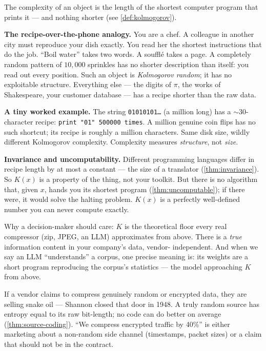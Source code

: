 \documentclass[12pt,a4paper]{article}
\theoremstyle{plain}
\theoremstyle{definition}
\begin{document}
\begin{intuition}
The complexity of an object is the length of the shortest computer
program that prints it --- and nothing shorter (see
\cref{def:kolmogorov}).

\textbf{The recipe-over-the-phone analogy.}  You are a chef.  A
colleague in another city must reproduce your dish exactly.  You read
her the shortest instructions that do the job.  ``Boil water'' takes
two words.  A souffl\'{e} takes a page.  A completely random pattern
of $10{,}000$ sprinkles has no shorter description than itself: you
read out every position.  Such an object is \emph{Kolmogorov random};
it has no exploitable structure.  Everything else --- the digits of
$\pi$, the works of Shakespeare, your customer database --- has a
recipe shorter than the raw data.

\textbf{A tiny worked example.}  The string
\texttt{01010101\ldots} (a million long) has a $\sim 30$-character
recipe: \texttt{print "01" 500000 times}.  A million genuine coin
flips has no such shortcut; its recipe is roughly a million
characters.  Same disk size, wildly different Kolmogorov complexity.
Complexity measures \emph{structure}, not \emph{size}.

\textbf{Invariance and uncomputability.}  Different programming
languages differ in recipe length by at most a constant --- the size
of a translator (\cref{thm:invariance}).  So $K(x)$ is a property of
the thing, not your toolkit.  But there is no algorithm that, given
$x$, hands you its shortest program (\cref{thm:uncomputable}); if
there were, it would solve the halting problem.  $K(x)$ is a perfectly
well-defined number you can never compute exactly.

Why a decision-maker should care: $K$ is the theoretical floor every
real compressor (zip, JPEG, an LLM) approximates from above.  There is
a \emph{true} information content in your company's data, vendor-
independent.  And when we say an LLM ``understands'' a corpus, one
precise meaning is: its weights are a short program reproducing the
corpus's statistics --- the model approaching $K$ from above.
\end{intuition}

\begin{intuition}[title={The compression sniff test}]
If a vendor claims to compress genuinely random or encrypted data,
they are selling snake oil --- Shannon closed that door in 1948.  A
truly random source has entropy equal to its raw bit-length; no code
can do better on average (\cref{thm:source-coding}).  ``We compress
encrypted traffic by 40\%'' is either marketing about a non-random
side channel (timestamps, packet sizes) or a claim that should not
be in the contract.
\end{intuition}
\end{document}
